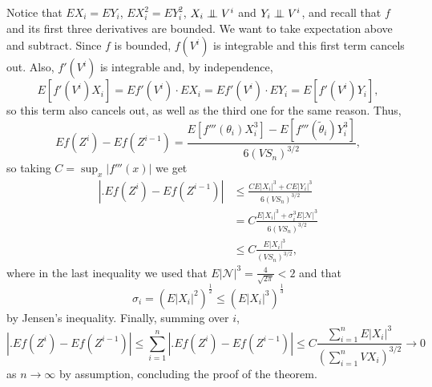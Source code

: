 \documentclass[a4paper,12pt]{article}
\theoremstyle{definition}
\newcommand{\ind}{\perp\mkern-10mu\perp}
\renewcommand{\leq}{\leqslant}
\renewcommand{\le}{\leqslant}
\begin{document}
Notice that $EX_i=EY_i$, $EX_i^2=EY_i^2$, $X_i \ind V^i$ and $Y_i \ind V^i$, and recall that $f$ and its first three derivatives are bounded.
We want to take expectation above and subtract. Since $f$ is bounded, $f(V^i)$ is integrable and this first term cancels out.
Also, $f'(V^i)$ is integrable and, by independence,
\[
E[f'(V^i) X_i] = Ef'(V^i) \cdot EX_i = Ef'(V^i) \cdot EY_i = E[f'(V^i) Y_i],
\]
so this term also cancels out, as well as the third one for the same reason.
Thus,
\[
Ef(Z^i) - Ef(Z^{i-1}) = \frac{E[f'''(\theta_i){X_i^3}] - E[f'''(\tilde\theta_i)Y_i^3]}{6({VS_n})^{3/2}}
,
\]
so taking $C=\sup_x |f'''(x)|$ we get
\begin{align*}
\left| \big. Ef(Z^i)-Ef(Z^{i-1}) \right|
& \leq
\frac{C E|X_i|^3 + CE|Y_i|^3}{6({VS_n})^{3/2}}
\\
& =
C \frac{ E|X_i|^3 + \sigma_i^3 E|\mathcal{N}|^3 }{6({VS_n})^{3/2}}
\\
& \leq
C \frac{ E|X_i|^3 }{({VS_n})^{3/2}}
,
\end{align*}
where in the last inequality we used that $E|\mathcal{N}|^3 = \frac{4}{\sqrt{2\pi}} < 2$ and that
\[
\sigma_i = (E|X_i|^2)^{\frac{1}{2}} \leq (E|X_i|^3)^{\frac{1}{3}}
\]
by Jensen's inequality.
Finally, summing over $i$,
\[
\left| \big. Ef(Z^i)-Ef(Z^{i-1}) \right|
\le
\sum_{i=1}^n
\left| \big. Ef(Z^i)-Ef(Z^{i-1}) \right|
\le
C
\frac{\sum_{i=1}^{n} E|X_i|^3}{\left( \sum_{i=1}^{n} VX_i \right)^{3/2}} \to 0
\]
as
$n\to \infty$
by assumption,
concluding the proof of the theorem.
\end{document}
